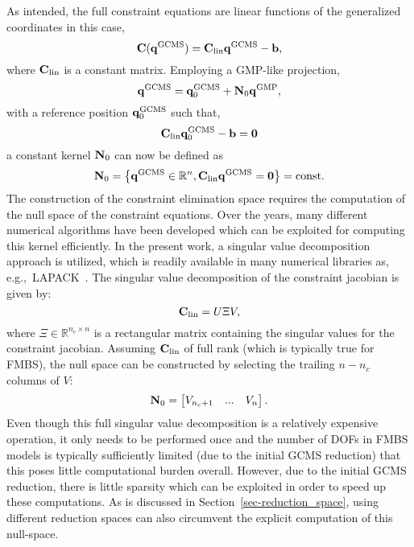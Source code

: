 As intended, the full constraint equations are linear functions of the generalized coordinates in this case,
\begin{equation}
\mathbf C(\mathbf q^{\rm GCMS}) = \mathbf C_{\rm lin} \mathbf q^{\rm GCMS} - \mathbf b ,
\end{equation}
where $\mathbf C_{\rm lin}$ is a constant matrix. Employing a GMP-like projection,
\begin{equation}
\mathbf q^{\rm GCMS} = \mathbf q^{\rm GCMS}_0 + \mathbf N_0\mathbf q^{\rm GMP},
\label{eq:qgcmsifqgmp}
\end{equation}
with a reference position $\mathbf q^{\rm GCMS}_0$ such that,
\begin{equation}
\mathbf C_{\rm lin} \mathbf q^{\rm GCMS}_0-\mathbf{b}=\mathbf{0}
\end{equation}
a constant kernel $\mathbf N_0$ can now be defined as
\begin{equation}
\mathbf N_0 = \left\{\mathbf q^{\rm GCMS} \in \mathbb{R}^{n} , \mathbf C_{\rm lin} \mathbf q^{\rm GCMS} = \mathbf{0} \right\} = \mathrm{const}.
\end{equation}
The construction of the constraint elimination space requires the computation of the null space of the constraint equations. 
Over the years, many different numerical algorithms have been developed which can be exploited for computing this kernel efficiently. In the present work, a singular value decomposition approach is utilized, which is readily available in many numerical libraries as, e.g.,~LAPACK~\cite{lapack}. The singular value decomposition of the constraint jacobian is given by:
\begin{equation}
\mathbf C_{\rm lin} = U\Xi V,
\end{equation}
where $\Xi \in \mathbb{R}^{n_c\times n}$ is a rectangular matrix containing the singular values for the constraint jacobian. Assuming $\mathbf C_{\rm lin}$ of full rank (which is typically true for FMBS), the null space can be constructed by selecting the trailing $n-n_c$ columns of $V$:
\begin{equation}
\mathbf N_0 = \begin{bmatrix} V_{n_c+1} & ... & V_{n}\end{bmatrix}.
\end{equation}
Even though this full singular value decomposition is a relatively expensive operation, it only needs to be performed once and the number of DOFs in FMBS models is typically sufficiently limited (due to the initial GCMS reduction) that this poses little computational burden overall. However, due to the initial GCMS reduction, there is little sparsity which can be exploited in order to speed up these computations. As is discussed in Section~\ref{sec-reduction_space}, using different reduction spaces can also circumvent the explicit computation of this null-space.     

